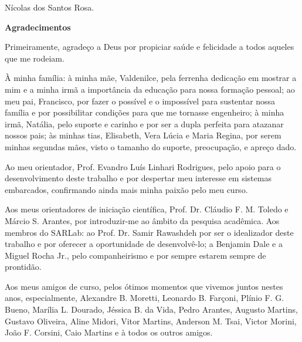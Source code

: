 \begin{flushright}
Nícolas dos Santos Rosa.
\end{flushright}

\cleardoublepage

\vspace{0.11\textheight} 

\begin{center}
\textbf{\Huge{Agradecimentos}}
\end{center}

\vspace{0.05\textheight}

Primeiramente, agradeço a Deus por propiciar saúde e felicidade a todos aqueles que me rodeiam.

À minha família: à minha mãe, Valdenilce, pela ferrenha dedicação em mostrar a mim e a minha irmã a importância da educação para nossa formação pessoal; ao meu pai, Francisco, por fazer o possível e o impossível para sustentar nossa família e por possibilitar condições para que me tornasse engenheiro; à minha irmã, Natália, pelo suporte e carinho e por ser a dupla perfeita para atazanar nossos pais; às minhas tias, Elisabeth, Vera Lúcia e Maria Regina, por serem minhas segundas mães, visto o tamanho do suporte, preocupação, e apreço dado. 

Ao meu orientador, Prof. Evandro Luís Linhari Rodrigues, pelo apoio para o desenvolvimento deste trabalho e por despertar meu interesse em sistemas embarcados, confirmando ainda mais minha paixão pelo meu curso.  

Aos meus orientadores de iniciação científica, Prof. Dr. Cláudio F. M. Toledo e Márcio S. Arantes, por introduzir-me ao âmbito da pesquisa acadêmica. Aos membros do SARLab: ao Prof. Dr. Samir Rawashdeh por ser o idealizador deste trabalho e por oferecer a oportunidade de desenvolvê-lo; a Benjamin Dale e a Miguel Rocha Jr., pelo companheirismo e por sempre estarem sempre de prontidão.

Aos meus amigos de curso, pelos ótimos momentos que vivemos juntos nestes anos, especialmente, Alexandre B. Moretti, Leonardo B. Farçoni, Plínio F. G. Bueno, Marília L. Dourado,  Jéssica B. da Vida, Pedro Arantes, Augusto Martins, Gustavo Oliveira, Aline Midori, Vitor Martins, Anderson M. Tsai, Victor Morini, João F. Corsini, Caio Martins e à todos os outros amigos. 

